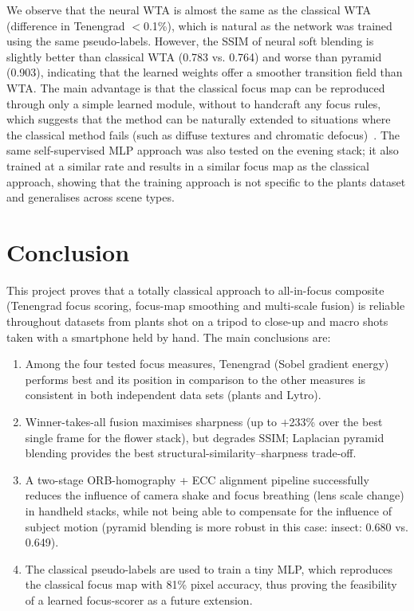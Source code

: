 \documentclass[conference]{IEEEtran}
\begin{document}
We observe that the neural WTA is almost the same as the classical WTA (difference in Tenengrad $<$0.1\%), which is natural as the network was trained using the same pseudo-labels. However, the SSIM of neural soft blending is slightly better than classical WTA (0.783 vs. 0.764) and worse than pyramid (0.903), indicating that the learned weights offer a smoother transition field than WTA. The main advantage is that the classical focus map can be reproduced through only a simple learned module, without to handcraft any focus rules, which suggests that the method can be naturally extended to situations where the classical method fails (such as diffuse textures and chromatic defocus)~\cite{liu2017multifocus}. The same self-supervised MLP approach was also tested on the evening stack; it also trained at a similar rate and results in a similar focus map as the classical approach, showing that the training approach is not specific to the plants dataset and generalises across scene types.
\section{Conclusion}

This project proves that a totally classical approach to all-in-focus composite (Tenengrad focus scoring, focus-map smoothing and multi-scale fusion) is reliable throughout datasets from plants shot on a tripod to close-up and macro shots taken with a smartphone held by hand. The main conclusions are:

\begin{enumerate}
  \item Among the four tested focus measures, Tenengrad (Sobel gradient energy) performs best and its position in comparison to the other measures is consistent in both independent data sets (plants and Lytro).
  \item Winner-takes-all fusion maximises sharpness (up to $+$233\% over the best single frame for the flower stack), but degrades SSIM; Laplacian pyramid blending provides the best structural-similarity--sharpness trade-off.
  \item A two-stage ORB-homography + ECC alignment pipeline successfully reduces the influence of camera shake and focus breathing (lens scale change) in handheld stacks, while not being able to compensate for the influence of subject motion (pyramid blending is more robust in this case: insect: 0.680 vs. 0.649).
  \item The classical pseudo-labels are used to train a tiny MLP, which reproduces the classical focus map with 81\% pixel accuracy, thus proving the feasibility of a learned focus-scorer as a future extension.
\end{enumerate}
\end{document}
